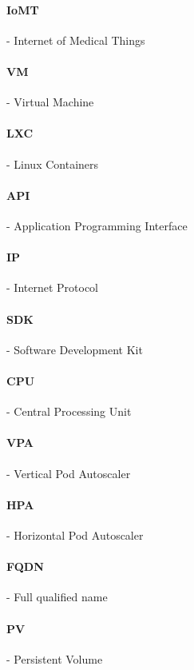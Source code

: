 \paragraph{IoMT} - Internet of Medical Things

\paragraph{VM} - Virtual Machine

\paragraph{LXC} - Linux Containers

\paragraph{API} - Application Programming Interface

\paragraph{IP} - Internet Protocol

\paragraph{SDK} - Software Development Kit

\paragraph{CPU} - Central Processing Unit

\paragraph{VPA} - Vertical Pod Autoscaler

\paragraph{HPA} - Horizontal Pod Autoscaler

\paragraph{FQDN} - Full qualified name

\paragraph{PV} - Persistent Volume


